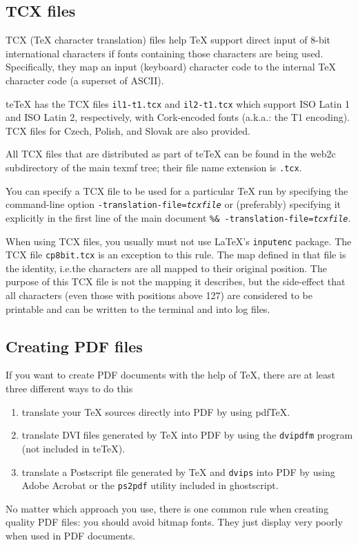 \documentclass[11pt,a4paper]{article}
\newcommand{\teTeX}{\textrm{te}\TeX\xspace}
\begin{document}
\subsection{TCX files}
TCX (\TeX{} character translation) files help \TeX{} support direct
input of 8-bit international characters if fonts containing those
characters are being used.  Specifically, they map an input (keyboard)
character code to the internal \TeX{} character code (a superset of
ASCII).

\teTeX{} has the TCX files \verb+il1-t1.tcx+ and \verb+il2-t1.tcx+
which support ISO Latin 1 and ISO Latin 2, respectively, with
Cork-encoded fonts (a.k.a.: the T1 encoding).  TCX files for Czech,
Polish, and Slovak are also provided.

All TCX files that are distributed as part of \teTeX{} can be found in
the web2c subdirectory of the main texmf tree; their file name
extension is \verb+.tcx+.

You can specify a TCX file to be used for a particular \TeX{} run by
specifying the command-line option
\hbox{\texttt{-translation-file=\textsl{tcxfile}}} or (preferably)
specifying it explicitly in the first line of the main document
\hbox{\texttt{\%\& -translation-file=\textsl{tcxfile}}}.

When using TCX files, you usually must not use \LaTeX's
\verb+inputenc+ package. The TCX file \verb+cp8bit.tcx+ is an
exception to this rule.  The map defined in that file is the identity,
i.e.\@ the characters are all mapped to their original position. The
purpose of this TCX file is not the mapping it describes, but the
side-effect that all characters (even those with positions above 127)
are considered to be printable and can be written to the terminal and
into log files.


\subsection{Creating PDF files}
If you want to create PDF documents with the help of \TeX, there are
at least three different ways to do this
\begin{enumerate}
\item translate your \TeX{} sources directly into PDF by using pdf\TeX.
\item translate DVI files generated by \TeX{} into PDF by using the
  \texttt{dvipdfm} program (not included in \teTeX).
\item translate a Postscript file generated by \TeX{} and
  \texttt{dvips} into PDF by using Adobe Acrobat or
  the \texttt{ps2pdf} utility included in ghostscript. 
\end{enumerate}
No matter which approach you use, there is one common rule when
creating quality PDF files: you should avoid bitmap fonts. They just
display very poorly when used in PDF documents.
\end{document}
